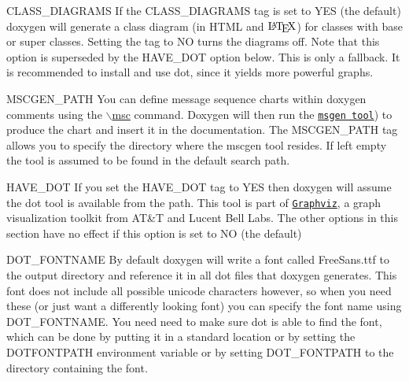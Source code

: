 \begin{DoxyDescription}
\item[{\ttfamily CLASS\_\-DIAGRAMS} ] If the {\ttfamily CLASS\_\-DIAGRAMS} tag is set to {\ttfamily YES} (the default) doxygen will generate a class diagram (in HTML and $\mbox{\LaTeX}$) for classes with base or super classes. Setting the tag to {\ttfamily NO} turns the diagrams off. Note that this option is superseded by the HAVE\_\-DOT option below. This is only a fallback. It is recommended to install and use dot, since it yields more powerful graphs.

\label{config_cfg_mscgen_path}
\hypertarget{config_cfg_mscgen_path}{}
 
\item[{\ttfamily MSCGEN\_\-PATH} ] You can define message sequence charts within doxygen comments using the \hyperlink{commands_cmdmsc}{$\backslash$msc} command. Doxygen will then run the \href{http://www.mcternan.me.uk/mscgen/}{\tt msgen tool}) to produce the chart and insert it in the documentation. The {\ttfamily MSCGEN\_\-PATH} tag allows you to specify the directory where the mscgen tool resides. If left empty the tool is assumed to be found in the default search path.

\label{config_cfg_have_dot}
\hypertarget{config_cfg_have_dot}{}
 
\item[{\ttfamily HAVE\_\-DOT} ] If you set the {\ttfamily HAVE\_\-DOT} tag to {\ttfamily YES} then doxygen will assume the dot tool is available from the path. This tool is part of \href{http://www.research.att.com/sw/tools/graphviz/}{\tt Graphviz}, a graph visualization toolkit from AT\&T and Lucent Bell Labs. The other options in this section have no effect if this option is set to {\ttfamily NO} (the default)

\label{config_cfg_dot_fontname}
\hypertarget{config_cfg_dot_fontname}{}
 
\item[{\ttfamily DOT\_\-FONTNAME} ] By default doxygen will write a font called {\ttfamily FreeSans.ttf} to the output directory and reference it in all dot files that doxygen generates. This font does not include all possible unicode characters however, so when you need these (or just want a differently looking font) you can specify the font name using {\ttfamily DOT\_\-FONTNAME}. You need need to make sure dot is able to find the font, which can be done by putting it in a standard location or by setting the {\ttfamily DOTFONTPATH} environment variable or by setting {\ttfamily DOT\_\-FONTPATH} to the directory containing the font.


\end{DoxyDescription}
